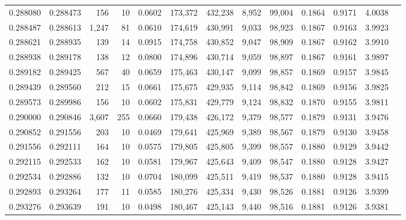 \begin{tabular}{rrrrrrrrrrrrr}
0.288080 & 0.288473 &   156 &  10 &                                     0.0602 & 173,372 & 432,238 &   8,952 &  99,004 & 0.1864 & 0.9171 & 4.0038 \\
0.288487 & 0.288613 & 1,247 &  81 &                                     0.0610 & 174,619 & 430,991 &   9,033 &  98,923 & 0.1867 & 0.9163 & 3.9923 \\
0.288621 & 0.288935 &   139 &  14 &                                     0.0915 & 174,758 & 430,852 &   9,047 &  98,909 & 0.1867 & 0.9162 & 3.9910 \\
0.288938 & 0.289178 &   138 &  12 &                                     0.0800 & 174,896 & 430,714 &   9,059 &  98,897 & 0.1867 & 0.9161 & 3.9897 \\
0.289182 & 0.289425 &   567 &  40 &                                     0.0659 & 175,463 & 430,147 &   9,099 &  98,857 & 0.1869 & 0.9157 & 3.9845 \\
0.289439 & 0.289560 &   212 &  15 &                                     0.0661 & 175,675 & 429,935 &   9,114 &  98,842 & 0.1869 & 0.9156 & 3.9825 \\
0.289573 & 0.289986 &   156 &  10 &                                     0.0602 & 175,831 & 429,779 &   9,124 &  98,832 & 0.1870 & 0.9155 & 3.9811 \\
0.290000 & 0.290846 & 3,607 & 255 &                                     0.0660 & 179,438 & 426,172 &   9,379 &  98,577 & 0.1879 & 0.9131 & 3.9476 \\
0.290852 & 0.291556 &   203 &  10 &                                     0.0469 & 179,641 & 425,969 &   9,389 &  98,567 & 0.1879 & 0.9130 & 3.9458 \\
0.291556 & 0.292111 &   164 &  10 &                                     0.0575 & 179,805 & 425,805 &   9,399 &  98,557 & 0.1880 & 0.9129 & 3.9442 \\
0.292115 & 0.292533 &   162 &  10 &                                     0.0581 & 179,967 & 425,643 &   9,409 &  98,547 & 0.1880 & 0.9128 & 3.9427 \\
0.292534 & 0.292886 &   132 &  10 &                                     0.0704 & 180,099 & 425,511 &   9,419 &  98,537 & 0.1880 & 0.9128 & 3.9415 \\
0.292893 & 0.293264 &   177 &  11 &                                     0.0585 & 180,276 & 425,334 &   9,430 &  98,526 & 0.1881 & 0.9126 & 3.9399 \\
0.293276 & 0.293639 &   191 &  10 &                                     0.0498 & 180,467 & 425,143 &   9,440 &  98,516 & 0.1881 & 0.9126 & 3.9381 \\

\end{tabular}
